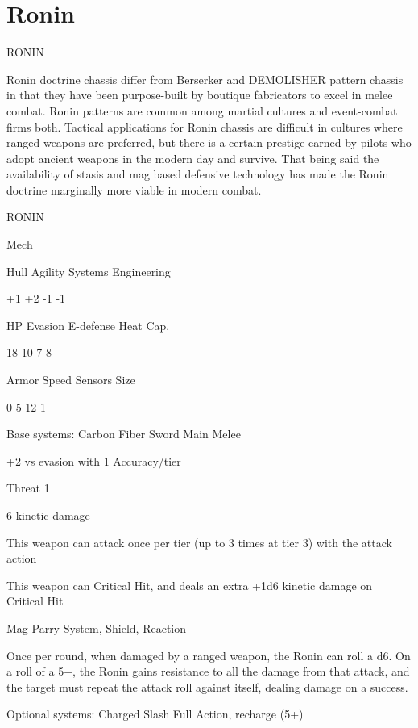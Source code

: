 \section{Ronin}

                                                  RONIN  

Ronin doctrine chassis differ from Berserker and DEMOLISHER pattern chassis in that they have  
been purpose-built by boutique fabricators to excel in melee combat. Ronin patterns are  
common among martial cultures and event-combat firms both. Tactical applications for Ronin  
chassis are difficult in cultures where ranged weapons are preferred, but there is a certain  
prestige earned by pilots who adopt ancient weapons in the modern day and survive. That being  
said the availability of stasis and mag based defensive technology has made the Ronin doctrine  
marginally more viable in modern combat. 
 

 RONIN 

 Mech 

 Hull       Agility      Systems       Engineering 

 +1         +2           -1            -1 

 HP         Evasion      E-defense     Heat Cap. 

 18         10           7             8 

 Armor      Speed        Sensors       Size 

 0          5            12            1 

Base systems:  
Carbon Fiber Sword  
Main Melee
 
+2 vs evasion with 1 Accuracy/tier
 
Threat 1
 
6 kinetic damage
 
This weapon can attack once per tier (up to 3 times at tier 3) with the attack action
 
This weapon can Critical Hit, and deals an extra +1d6 kinetic damage on Critical Hit
 

Mag Parry  
System, Shield, Reaction
 
Once per round, when damaged by a ranged weapon, the Ronin can roll a d6. On a roll of a 5+,  
the Ronin gains resistance to all the damage from that attack, and the target must repeat the  
attack roll against itself, dealing damage on a success.
 

Optional systems:  
Charged Slash  
Full Action, recharge (5+)
 

